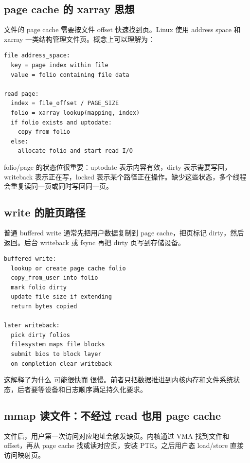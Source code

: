 \subsection{page cache 的 xarray 思想}

文件的 page cache 需要按文件 offset 快速找到页。Linux 使用 address space 和 xarray 一类结构管理文件页。概念上可以理解为：

\begin{lstlisting}
file address_space:
  key = page index within file
  value = folio containing file data

read page:
  index = file_offset / PAGE_SIZE
  folio = xarray_lookup(mapping, index)
  if folio exists and uptodate:
    copy from folio
  else:
    allocate folio and start read I/O
\end{lstlisting}

folio/page 的状态位很重要：uptodate 表示内容有效，dirty 表示需要写回，writeback 表示正在写，locked 表示某个路径正在操作。缺少这些状态，多个线程会重复读同一页或同时写回同一页。

\subsection{write 的脏页路径}

普通 buffered write 通常先把用户数据复制到 page cache，把页标记 dirty，然后返回。后台 writeback 或 fsync 再把 dirty 页写到存储设备。

\begin{lstlisting}
buffered write:
  lookup or create page cache folio
  copy_from_user into folio
  mark folio dirty
  update file size if extending
  return bytes copied

later writeback:
  pick dirty folios
  filesystem maps file blocks
  submit bios to block layer
  on completion clear writeback
\end{lstlisting}

这解释了为什么  可能很快而  很慢。前者只把数据推进到内核内存和文件系统状态，后者要等设备和日志顺序满足持久化要求。

\subsection{mmap 读文件：不经过 read 也用 page cache}

 文件后，用户第一次访问对应地址会触发缺页。内核通过 VMA 找到文件和 offset，再从 page cache 找或读对应页，安装 PTE。之后用户态 load/store 直接访问映射页。

